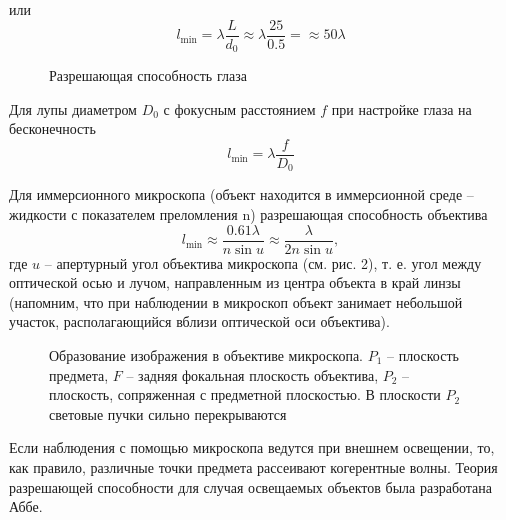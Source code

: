 \documentclass[14pt]{article}
\begin{document}
или
$$
	l_\text{min} = \lambda\frac{L}{d_0} \approx \lambda\frac{25}{0.5} = \approx 50\lambda
$$

\begin{figure}[h!]
	\caption{Разрешающая способность глаза}
	\label{fig:image}
\end{figure}

Для лупы диаметром $D_0$ с фокусным расстоянием $f$ при настройке
глаза на бесконечность
$$
	l_\text{min} = \lambda\frac{f}{D_0}
$$

Для иммерсионного микроскопа (объект находится в иммерсионной
среде -- жидкости с показателем преломления n) разрешающая способность объектива
$$
	l_\text{min} \approx \frac{0.61\lambda}{n\sin u} \approx \frac{\lambda}{2n\sin u},
$$
\noindent где $u$ -- апертурный угол объектива микроскопа (см. рис. 2), т. е. угол
между оптической осью
и лучом, направленным из центра объекта
в край линзы (напомним, что при наблюдении в микроскоп объект занимает
небольшой участок, располагающийся вблизи оптической оси объектива).

\begin{figure}[h!]
	\caption{Образование изображения в объективе микроскопа. $P_1$ -- плоскость предмета, $F$ -- задняя фокальная плоскость объектива,
			 $P_2$ -- плоскость, сопряженная с предметной плоскостью. В плоскости $P_2$ световые пучки сильно перекрываются}
	\label{fig:image}
\end{figure}

Если наблюдения с помощью микроскопа ведутся при внешнем освещении, то,
как правило, различные точки предмета рассеивают когерентные волны.
Теория разрешающей способности для случая освещаемых
объектов была разработана Аббе.
\end{document}
